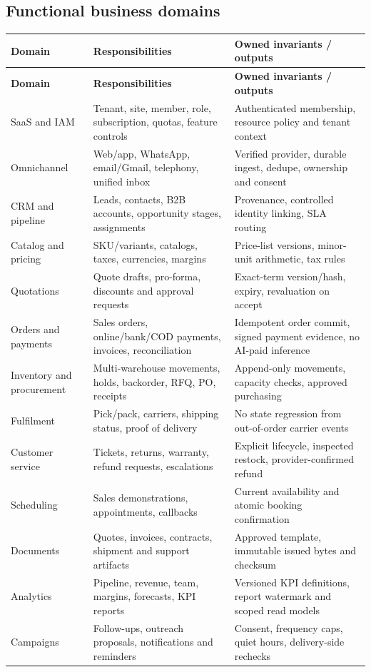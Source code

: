 \documentclass[10.5pt,a4paper,oneside]{article}
\begin{document}
\subsection{Functional business domains}
\small
\begin{longtable}{@{}L{33mm}L{58mm}L{66mm}@{}}
\toprule{}\textbf{Domain} & \textbf{Responsibilities} & \textbf{Owned invariants / outputs}\\\midrule
\endfirsthead
\toprule{}\textbf{Domain} & \textbf{Responsibilities} & \textbf{Owned invariants / outputs}\\\midrule
\endhead
SaaS and IAM & Tenant, site, member, role, subscription, quotas, feature controls & Authenticated membership, resource policy and tenant context\\
Omnichannel & Web/app, WhatsApp, email/Gmail, telephony, unified inbox & Verified provider, durable ingest, dedupe, ownership and consent\\
CRM and pipeline & Leads, contacts, B2B accounts, opportunity stages, assignments & Provenance, controlled identity linking, SLA routing\\
Catalog and pricing & SKU/variants, catalogs, taxes, currencies, margins & Price-list versions, minor-unit arithmetic, tax rules\\
Quotations & Quote drafts, pro-forma, discounts and approval requests & Exact-term version/hash, expiry, revaluation on accept\\
Orders and payments & Sales orders, online/bank/COD payments, invoices, reconciliation & Idempotent order commit, signed payment evidence, no AI-paid inference\\
Inventory and procurement & Multi-warehouse movements, holds, backorder, RFQ, PO, receipts & Append-only movements, capacity checks, approved purchasing\\
Fulfilment & Pick/pack, carriers, shipping status, proof of delivery & No state regression from out-of-order carrier events\\
Customer service & Tickets, returns, warranty, refund requests, escalations & Explicit lifecycle, inspected restock, provider-confirmed refund\\
Scheduling & Sales demonstrations, appointments, callbacks & Current availability and atomic booking confirmation\\
Documents & Quotes, invoices, contracts, shipment and support artifacts & Approved template, immutable issued bytes and checksum\\
Analytics & Pipeline, revenue, team, margins, forecasts, KPI reports & Versioned KPI definitions, report watermark and scoped read models\\
Campaigns & Follow-ups, outreach proposals, notifications and reminders & Consent, frequency caps, quiet hours, delivery-side rechecks\\
\bottomrule
\end{longtable}
\normalsize
\end{document}
